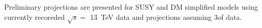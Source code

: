 Preliminary projections are presented for SUSY and DM
simplified models using currently recoreded $\sqrt{s} =$ 13~TeV data and
projections assuming $3$\ifb of data.




